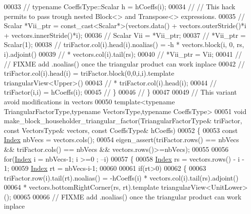\begin{DoxyCode}
00033 \textcolor{comment}{//     typename CoeffsType::Scalar h = hCoeffs(i);}
00034 \textcolor{comment}{//     // This hack permits to pass trough nested Block<> and Transpose<> expressions.}
00035 \textcolor{comment}{//     Scalar *Vii\_ptr = const\_cast<Scalar*>(vectors.data() + vectors.outerStride()*i +
       vectors.innerStride()*i);}
00036 \textcolor{comment}{//     Scalar Vii = *Vii\_ptr;}
00037 \textcolor{comment}{//     *Vii\_ptr = Scalar(1);}
00038 \textcolor{comment}{//     triFactor.col(i).head(i).noalias() = -h * vectors.block(i, 0, rs, i).adjoint()}
00039 \textcolor{comment}{//                                        * vectors.col(i).tail(rs);}
00040 \textcolor{comment}{//     *Vii\_ptr = Vii;}
00041 \textcolor{comment}{//     // FIXME add .noalias() once the triangular product can work inplace}
00042 \textcolor{comment}{//     triFactor.col(i).head(i) = triFactor.block(0,0,i,i).template triangularView<Upper>()}
00043 \textcolor{comment}{//                              * triFactor.col(i).head(i);}
00044 \textcolor{comment}{//     triFactor(i,i) = hCoeffs(i);}
00045 \textcolor{comment}{//   \}}
00046 \textcolor{comment}{// \}}
00047 
00049 \textcolor{comment}{// This variant avoid modifications in vectors}
00050 \textcolor{keyword}{template}<\textcolor{keyword}{typename} TriangularFactorType,\textcolor{keyword}{typename} VectorsType,\textcolor{keyword}{typename} CoeffsType>
00051 \textcolor{keywordtype}{void} make\_block\_householder\_triangular\_factor(TriangularFactorType& triFactor, \textcolor{keyword}{const} VectorsType& vectors, \textcolor{keyword}{
      const} CoeffsType& hCoeffs)
00052 \{
00053   \textcolor{keyword}{const} \hyperlink{namespace_eigen_a62e77e0933482dafde8fe197d9a2cfde}{Index} nbVecs = vectors.cols();
00054   eigen\_assert(triFactor.rows() == nbVecs && triFactor.cols() == nbVecs && vectors.rows()>=nbVecs);
00055 
00056   \textcolor{keywordflow}{for}(\hyperlink{namespace_eigen_a62e77e0933482dafde8fe197d9a2cfde}{Index} i = nbVecs-1; i >=0 ; --i)
00057   \{
00058     \hyperlink{namespace_eigen_a62e77e0933482dafde8fe197d9a2cfde}{Index} rs = vectors.rows() - i - 1;
00059     \hyperlink{namespace_eigen_a62e77e0933482dafde8fe197d9a2cfde}{Index} rt = nbVecs-i-1;
00060 
00061     \textcolor{keywordflow}{if}(rt>0)
00062     \{
00063       triFactor.row(i).tail(rt).noalias() = -hCoeffs(i) * vectors.col(i).tail(rs).adjoint()
00064                                                         * vectors.bottomRightCorner(rs, rt).template 
      triangularView<UnitLower>();
00065             
00066       \textcolor{comment}{// FIXME add .noalias() once the triangular product can work inplace}

\end{DoxyCode}
